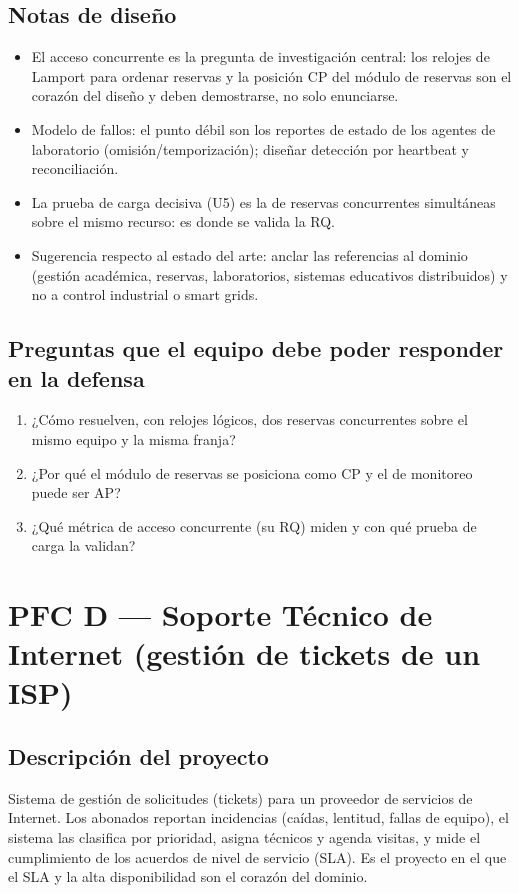 \documentclass[11pt]{article}
\begin{document}
\subsection{Notas de diseño}
\begin{itemize}[leftmargin=1.2em,itemsep=2pt]
\item El acceso concurrente es la pregunta de investigación central: los relojes de Lamport para ordenar reservas y la posición CP del módulo de reservas son el corazón del diseño y deben demostrarse, no solo enunciarse.
\item Modelo de fallos: el punto débil son los reportes de estado de los agentes de laboratorio (omisión/temporización); diseñar detección por heartbeat y reconciliación.
\item La prueba de carga decisiva (U5) es la de reservas concurrentes simultáneas sobre el mismo recurso: es donde se valida la RQ.
\item Sugerencia respecto al estado del arte: anclar las referencias al dominio (gestión académica, reservas, laboratorios, sistemas educativos distribuidos) y no a control industrial o smart grids.
\end{itemize}
\subsection{Preguntas que el equipo debe poder responder en la defensa}
\begin{enumerate}[leftmargin=1.4em,itemsep=2pt]
\item ¿Cómo resuelven, con relojes lógicos, dos reservas concurrentes sobre el mismo equipo y la misma franja?
\item ¿Por qué el módulo de reservas se posiciona como CP y el de monitoreo puede ser AP?
\item ¿Qué métrica de acceso concurrente (su RQ) miden y con qué prueba de carga la validan?
\end{enumerate}
\clearpage
\section{PFC D --- Soporte Técnico de Internet (gestión de tickets de un ISP)}
\subsection{Descripción del proyecto}
Sistema de gestión de solicitudes (tickets) para un proveedor de servicios de Internet. Los abonados reportan incidencias (caídas, lentitud, fallas de equipo), el sistema las clasifica por prioridad, asigna técnicos y agenda visitas, y mide el cumplimiento de los acuerdos de nivel de servicio (SLA). Es el proyecto en el que el SLA y la alta disponibilidad son el corazón del dominio.
\end{document}
